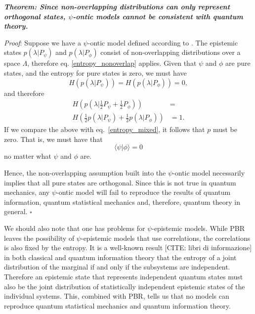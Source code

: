 \documentclass[twocolumn,prl,floatfix,superscriptaddress]{revtex4-2}
\begin{document}
\emph{\textbf{Theorem: Since non-overlapping distributions can only represent orthogonal states, $\psi$-ontic models cannot be consistent with quantum theory.}}

\emph{Proof}: Suppose we have a $\psi$-ontic model defined according to \cite{Harrigan:2010}. The epistemic states $p(\lambda|P_\psi)$ and $p(\lambda|P_\phi)$ consist of non-overlapping distributions over a space $\Lambda$, therefore eq. \ref{entropy_nonoverlap} applies. Given that $\psi$ and $\phi$ are pure states, and the entropy for pure states is zero, we must have
\begin{equation}\label{entropy_pure}
	H(p(\lambda|P_\psi)) = H(p(\lambda|P_\phi)) = 0,
\end{equation}
and therefore
\begin{equation}\label{required_entropy}
	\begin{aligned}
		H\left(p(\lambda|\frac{1}{2}P_\psi + \frac{1}{2}P_\phi)\right) &= \\
		H\left(\frac{1}{2}p(\lambda|P_\psi) + \frac{1}{2}p(\lambda|P_\phi)\right) 
		&= 1.
	\end{aligned}
\end{equation}
If we compare the above with eq.~\ref{entropy_mixed}, it follows that $p$ must be zero. That is, we must have that
\begin{equation}\label{orthogonal}
	\langle \psi | \phi \rangle = 0
\end{equation}
no matter what $\psi$ and $\phi$ are.

Hence, the non-overlapping assumption built into the $\psi$-ontic model necessarily implies that all pure states are orthogonal. Since this is not true in quantum mechanics, any $\psi$-ontic model will fail to reproduce the results of quantum information, quantum statistical mechanics and, therefore, quantum theory in general. $\square$

We should also note that one has problems for $\psi$-epistemic models. While PBR leaves the possibility of $\psi$-epistemic models that use correlations, the correlations is also fixed by the entropy. It is a well-known result  [CITE: libri di informazione] in both classical and quantum information theory that the entropy of a joint distribution of the marginal if and only if the subsystems are independent. Therefore an epistemic state that represents independent quantum states must also be the joint distribution of statistically independent epistemic states of the individual systems. This, combined with PBR, tells us that no models can reproduce quantum statistical mechanics and quantum information theory.
\end{document}
